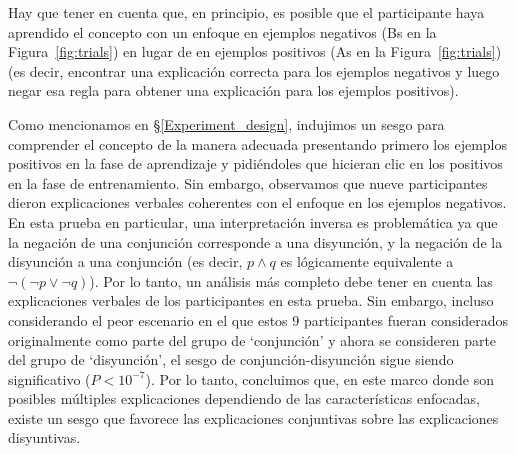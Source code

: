 Hay que tener en cuenta que, en principio, es posible que el participante haya aprendido el concepto con un enfoque en ejemplos negativos ({\sf B}s en la Figura~\ref{fig:trials}) en lugar de en ejemplos positivos ({\sf A}s en la Figura~\ref{fig:trials}) (es decir, encontrar una explicación correcta para los ejemplos negativos y luego negar esa regla para obtener una explicación para los ejemplos positivos).

Como mencionamos en \S\ref{Experiment_design}, indujimos un sesgo para comprender el concepto de la manera adecuada presentando primero los ejemplos positivos en la fase de aprendizaje y pidiéndoles que hicieran clic en los positivos en la fase de entrenamiento. Sin embargo, observamos que nueve participantes dieron explicaciones verbales coherentes con el enfoque en los ejemplos negativos. En esta prueba en particular, una interpretación inversa es problemática ya que la negación de una conjunción corresponde a una disyunción, y la negación de la disyunción a una conjunción (es decir, $ p \land q $ es lógicamente equivalente a $ \lnot (\lnot p \lor \lnot q) $). Por lo tanto, un análisis más completo debe tener en cuenta las explicaciones verbales de los participantes en esta prueba. Sin embargo, incluso considerando el peor escenario en el que estos 9 participantes fueran considerados originalmente como parte del grupo de  `conjunción' y ahora se consideren parte del grupo de `disyunción', el sesgo de conjunción-disyunción sigue siendo significativo ($ P<10^{-7} $). Por lo tanto, concluimos que, en este marco donde son posibles múltiples explicaciones dependiendo de las características enfocadas, existe un sesgo que favorece las explicaciones conjuntivas sobre las explicaciones disyuntivas.

